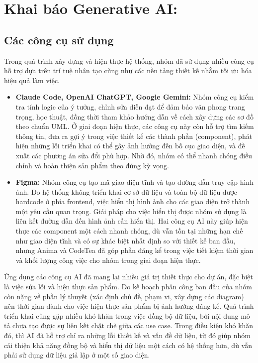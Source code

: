 \section{Khai báo Generative AI:}

\subsection{Các công cụ sử dụng}
Trong quá trình xây dựng và hiện thực hệ thống, nhóm đã sử dụng nhiều công cụ hỗ trợ dựa trên trí tuệ nhân tạo cũng như các nền tảng thiết kế nhằm tối ưu hóa hiệu quả làm việc.

\begin{itemize}
    \item \textbf{Claude Code, OpenAI ChatGPT, Google Gemini:} Nhóm công cụ kiểm tra tính logic của ý tưởng, chỉnh sửa diễn đạt để đảm bảo văn phong trang trọng, học thuật, đồng thời tham khảo hướng dẫn về cách xây dựng các sơ đồ theo chuẩn UML. Ở giai đoạn hiện thực, các công cụ này còn hỗ trợ tìm kiếm thông tin, đưa ra gợi ý trong việc thiết kế các thành phần (component), phát hiện những lỗi triển khai có thể gây ảnh hưởng đến bố cục giao diện, và đề xuất các phương án sửa đổi phù hợp. Nhờ đó, nhóm có thể nhanh chóng điều chỉnh và hoàn thiện sản phẩm theo đúng kỳ vọng.
    \item \textbf{Figma:} Nhóm công cụ tạo mã giao diện tĩnh và tạo đường dẫn truy cập hình ảnh. Do hệ thống không triển khai cơ sở dữ liệu và toàn bộ dữ liệu được hardcode ở phía frontend, việc hiển thị hình ảnh cho các giao diện trở thành một yêu cầu quan trọng. Giải pháp cho việc hiển thị được nhóm sử dụng là liên kết đường dẫn đến hình ảnh cần hiển thị. Hai công cụ AI này giúp hiện thực các component một cách nhanh chóng, dù vẫn tồn tại những hạn chế như giao diện tĩnh và có sự khác biệt nhất định so với thiết kế ban đầu, nhưng Anima và CodeTea đã góp phần đáng kể trong việc tiết kiệm thời gian và khối lượng công việc cho nhóm trong giai đoạn hiện thực.
\end{itemize}

Ứng dụng các công cụ AI đã mang lại nhiều giá trị thiết thực cho dự án, đặc biệt là việc sửa lỗi và hiện thực sản phẩm. Do kế hoạch phân công ban đầu của nhóm còn nặng về phần lý thuyết (xác định chủ đề, phạm vi, xây dựng các diagram) nên thời gian dành cho việc hiện thực sản phẩm bị ảnh hưởng đáng kể. Quá trình triển khai cũng gặp nhiều khó khăn trong việc đồng bộ dữ liệu, bởi nội dung mô tả chưa tạo được sự liên kết chặt chẽ giữa các use case. Trong điều kiện khó khăn đó, thì AI đã hỗ trợ chỉ ra những lỗi thiết kế và vấn đề dữ liệu, từ đó giúp nhóm cải thiện khả năng đồng bộ và hiển thị dữ liệu một cách có hệ thống hơn, dù vẫn phải sử dụng dữ liệu giả lập ở một số giao diện.

